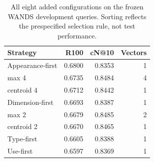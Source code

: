 \begin{table}[htbp]
\caption{All eight added configurations on the frozen WANDS development queries. Sorting reflects the prespecified selection rule, not test performance.}\label{tab:screening}
\centering\small
\begin{tabular}{lrrr}\toprule
Strategy & R100 & cN@10 & Vectors\\\midrule
Appearance-first & 0.6800 & 0.8353 & 1\\
max 4 & 0.6735 & 0.8484 & 4\\
centroid 4 & 0.6712 & 0.8442 & 1\\
Dimension-first & 0.6693 & 0.8387 & 1\\
max 2 & 0.6679 & 0.8485 & 2\\
centroid 2 & 0.6670 & 0.8465 & 1\\
Type-first & 0.6605 & 0.8388 & 1\\
Use-first & 0.6597 & 0.8369 & 1\\
\bottomrule\end{tabular}
\end{table}
